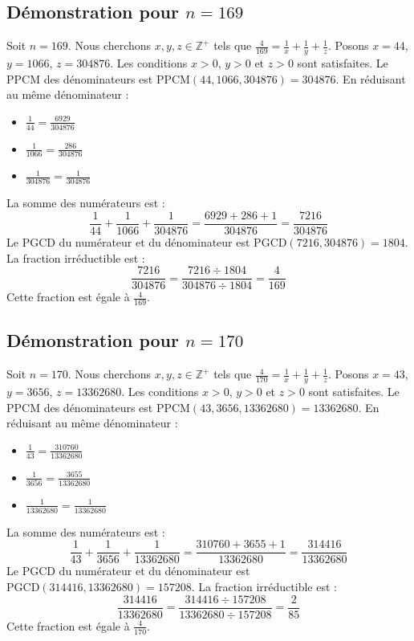 \documentclass[11pt,a4paper]{article}
\begin{document}
\subsection{Démonstration pour $n = 169$}
Soit $n = 169$. Nous cherchons $x, y, z \in \mathbb{Z}^{+}$ tels que $\frac{4}{169} = \frac{1}{x} + \frac{1}{y} + \frac{1}{z}$.
Posons $x = 44$, $y = 1066$, $z = 304876$.
Les conditions $x > 0$, $y > 0$ et $z > 0$ sont satisfaites.
Le PPCM des dénominateurs est $\text{PPCM}(44, 1066, 304876) = 304876$.
En réduisant au même dénominateur :
\begin{itemize}
    \item $\frac{1}{44} = \frac{6929}{304876}$
    \item $\frac{1}{1066} = \frac{286}{304876}$
    \item $\frac{1}{304876} = \frac{1}{304876}$
\end{itemize}
La somme des numérateurs est :
$$ \frac{1}{44} + \frac{1}{1066} + \frac{1}{304876} = \frac{6929 + 286 + 1}{304876} = \frac{7216}{304876} $$
Le PGCD du numérateur et du dénominateur est $\text{PGCD}(7216, 304876) = 1804$.
La fraction irréductible est :
$$ \frac{7216}{304876} = \frac{7216 \div 1804}{304876 \div 1804} = \frac{4}{169} $$
Cette fraction est égale à $\frac{4}{169}$.

\subsection{Démonstration pour $n = 170$}
Soit $n = 170$. Nous cherchons $x, y, z \in \mathbb{Z}^{+}$ tels que $\frac{4}{170} = \frac{1}{x} + \frac{1}{y} + \frac{1}{z}$.
Posons $x = 43$, $y = 3656$, $z = 13362680$.
Les conditions $x > 0$, $y > 0$ et $z > 0$ sont satisfaites.
Le PPCM des dénominateurs est $\text{PPCM}(43, 3656, 13362680) = 13362680$.
En réduisant au même dénominateur :
\begin{itemize}
    \item $\frac{1}{43} = \frac{310760}{13362680}$
    \item $\frac{1}{3656} = \frac{3655}{13362680}$
    \item $\frac{1}{13362680} = \frac{1}{13362680}$
\end{itemize}
La somme des numérateurs est :
$$ \frac{1}{43} + \frac{1}{3656} + \frac{1}{13362680} = \frac{310760 + 3655 + 1}{13362680} = \frac{314416}{13362680} $$
Le PGCD du numérateur et du dénominateur est $\text{PGCD}(314416, 13362680) = 157208$.
La fraction irréductible est :
$$ \frac{314416}{13362680} = \frac{314416 \div 157208}{13362680 \div 157208} = \frac{2}{85} $$
Cette fraction est égale à $\frac{4}{170}$.
\end{document}
